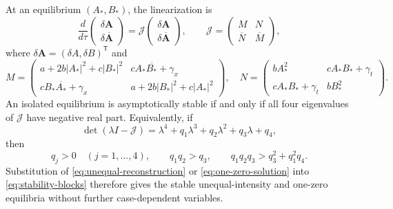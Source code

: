 At an equilibrium $(A_*,B_*)$, the linearization is
\begin{equation}
 \frac{d}{d\tau}
 \begin{pmatrix}\delta\mathbf A\\ \delta\overline{\mathbf A}\end{pmatrix}
 =\mathcal J
 \begin{pmatrix}\delta\mathbf A\\ \delta\overline{\mathbf A}\end{pmatrix},
 \qquad
 \mathcal J=\begin{pmatrix}M&N\\ \overline N&\overline M\end{pmatrix},
 \label{eq:full-Jacobian}
\end{equation}
where $\delta\mathbf A=(\delta A,\delta B)^\mathsf T$ and
\begin{equation}
 M=\begin{pmatrix}
 a+2b|A_*|^2+c|B_*|^2&cA_*\overline{B_*}+\gamma_x\\
 cB_*\overline{A_*}+\gamma_x&a+2b|B_*|^2+c|A_*|^2
 \end{pmatrix},
 \quad
 N=\begin{pmatrix}
 bA_*^2&cA_*B_*+\gamma_t\\
 cA_*B_*+\gamma_t&bB_*^2
 \end{pmatrix}.
 \label{eq:stability-blocks}
\end{equation}
An isolated equilibrium is asymptotically stable if and only if all four
eigenvalues of $\mathcal J$ have negative real part.  Equivalently, if
\begin{equation}
 \det(\lambda I-\mathcal J)
 =\lambda^4+q_1\lambda^3+q_2\lambda^2+q_3\lambda+q_4,
 \label{eq:stability-quartic}
\end{equation}
then
\begin{equation}
 q_j>0\quad(j=1,\ldots,4),
 \qquad q_1q_2>q_3,
 \qquad q_1q_2q_3>q_3^2+q_1^2q_4.
 \label{eq:stability-Hurwitz}
\end{equation}
Substitution of \eqref{eq:unequal-reconstruction} or
\eqref{eq:one-zero-solution} into \eqref{eq:stability-blocks} therefore
gives the stable unequal-intensity and one-zero equilibria without further
case-dependent variables.


